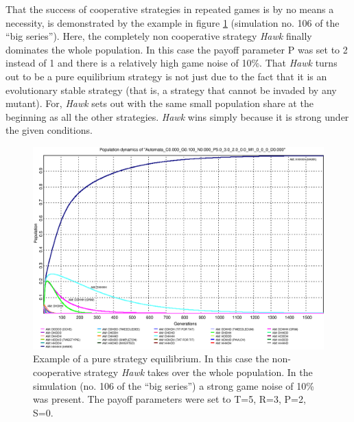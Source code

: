 That the success of cooperative strategies in repeated games is by no means a
necessity, is demonstrated by the example in figure \ref{SimExample2}
(simulation no. 106 of the ``big series''). Here,
the completely non cooperative strategy {\em Hawk} finally dominates the whole
population. In this case the payoff parameter P was set to 2 instead of 1 and
there is a relatively high game noise of 10\%. That {\em Hawk} turns out to
be a pure equilibrium strategy is not just due to the fact that it is an
evolutionary stable strategy (that is, a strategy that cannot be invaded by any
mutant). For, {\em Hawk} sets out with the same small population share at the
beginning as all the other strategies. {\em Hawk} wins simply because it is
strong under the given conditions.

\begin{figure}
\begin{center}
\includegraphics[width=20cm]{images/SimulationBS106_refined.eps}
  \caption{\label{SimExample2} Example of a pure strategy equilibrium.
    In this case the non-cooperative strategy {\em Hawk} takes over
    the whole population. In the simulation (no. 106 of the ``big series'')
a strong game noise of 10\% was present. The payoff parameters were set to
T=5, R=3, P=2, S=0.}
\end{center}
\end{figure}

